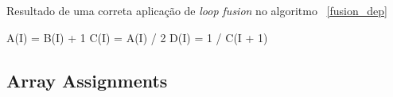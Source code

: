 \begin{algorithm}
\caption{Resultado de uma correta aplicação de \textit{loop fusion} no 
        algoritmo ~\ref{fusion_dep}} 
\label{fusion_dep3}
\begin{algorithmic}[1]

\STATE A(I) = B(I) + 1
\STATE C(I) = A(I) / 2
\ENDFOR
{}
\STATE D(I) = 1 / C(I + 1)
\ENDFOR

\end{algorithmic}
\end{algorithm}


\subsection{Array Assignments}


